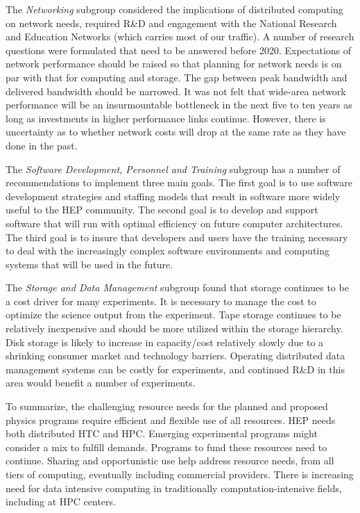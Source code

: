 The {\it Networking} subgroup considered the implications of distributed
computing on network needs, required R\&D and engagement with the National
Research and Education Networks (which carries most of our traffic). A
number of research questions were formulated that need to be answered
before 2020. Expectations of network performance should be raised so that
planning for network needs is on par with that for computing and storage.
The gap between peak bandwidth and delivered bandwidth should be narrowed.
It was not felt that wide-area network performance will be an
insurmountable bottleneck in the next five to ten years as long as
investments in higher performance links continue. However, there is
uncertainty as to whether network costs will drop at the same rate as they
have done in the past.

The {\it Software Development, Personnel and Training} subgroup has a
number of recommendations to implement three main goals. The first goal is
to use software development strategies and staffing models that result in
software more widely useful to the HEP community. The second goal is to
develop and support software that will run with optimal efficiency on
future computer architectures. The third goal is to insure that developers
and users have the training necessary to deal with the increasingly complex
software environments and computing systems that will be used in the future.

The {\it Storage and Data Management} subgroup found that storage continues
to be a cost driver for many experiments. It is necessary to manage the
cost to optimize the science output from the experiment. Tape storage
continues to be relatively inexpensive and should be more utilized within
the storage hierarchy. 
Disk storage is likely to increase in capacity/cost relatively slowly due
to a shrinking consumer market and technology barriers.
Operating distributed data management systems can be costly for
experiments, and continued R\&D in this area would benefit a number of 
experiments.

To summarize, the challenging resource needs for the planned and proposed
physics programs require efficient and flexible use of all resources. HEP
needs both distributed HTC and HPC. Emerging experimental programs might
consider a mix to fulfill demands. Programs to fund these resources need to
continue. Sharing and opportunistic use help address resource needs, from
all tiers of computing, eventually including commercial providers. There is
increasing need for data intensive computing in traditionally
computation-intensive fields, including at HPC centers.  

